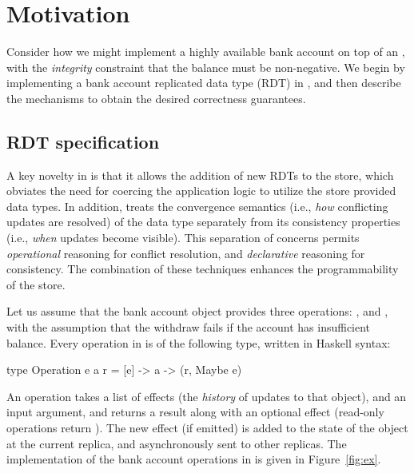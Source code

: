 \section{Motivation}
\label{sec:motivation}

Consider how we might implement a highly available bank account on top of an
\ecds, with the \emph{integrity} constraint that the balance must be
non-negative. We begin by implementing a bank account replicated data type
(RDT) in \name, and then describe the mechanisms to obtain the desired
correctness guarantees.

\subsection{RDT specification}

A key novelty in \name is that it allows the addition of new RDTs to the store,
which obviates the need for coercing the application logic to utilize the store
provided data types. In addition, \name treats the convergence semantics (i.e.,
\emph{how} conflicting updates are resolved) of the data type separately from
its consistency properties (i.e., \emph{when} updates become visible). This
separation of concerns permits \emph{operational} reasoning for conflict
resolution, and \emph{declarative} reasoning for consistency. The combination
of these techniques enhances the programmability of the store.

Let us assume that the bank account object provides three operations:
,  and , with the assumption that the
withdraw fails if the account has insufficient balance. Every operation in
\name is of the following type, written in Haskell syntax:

\begin{codehaskell}
type Operation e a r = [e] -> a -> (r, Maybe e)
\end{codehaskell}

\noindent An operation takes a list of effects (the \emph{history} of updates to that
object), and an input argument, and returns a result along with an optional
effect (read-only operations return ). The new effect (if emitted)
is added to the state of the object at the current replica, and asynchronously
sent to other replicas. The implementation of the bank account operations in
\name is given in Figure~\ref{fig:ex}.

